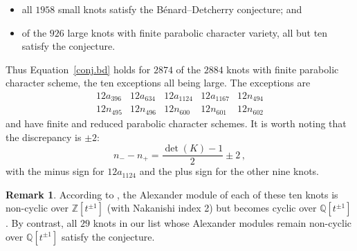 \documentclass[12pt,reqno]{amsart}
\theoremstyle{definition}
\newtheorem{remark}[theorem]{Remark}
\begin{document}
	\begin{itemize}
		\item all $1958$ small knots satisfy the B\'{e}nard--Detcherry conjecture; and
		\item of the $926$ large knots with finite parabolic character variety, all but ten satisfy the conjecture.
	\end{itemize}
	Thus Equation~\eqref{conj.bd} holds for $2874$ of the $2884$ knots with finite parabolic character scheme, the ten exceptions all being large. The exceptions are
	\[
	\begin{array}{*{5}{l}}
		12a_{396} & 12a_{634} & 12a_{1124} & 12a_{1167} & 12n_{494} \\
		12n_{495} & 12n_{496} & 12n_{600} & 12n_{601} & 12n_{602}
	\end{array}
	\]
	and have finite and reduced parabolic character schemes. It is worth noting that the discrepancy is $\pm2$:
	\begin{equation*}
	n_- - n_+ = \frac{\det(K)-1}{2}\pm 2\,,
	\end{equation*}
	with the minus sign for $12a_{1124}$ and the plus sign for the other nine knots. 
    \begin{remark}
    According to \cite{knotinfo}, the Alexander module of each of these ten knots is non-cyclic over $\mathbb{Z}[t^{\pm1}]$ (with Nakanishi index 2) but becomes cyclic over $\mathbb{Q}[t^{\pm1}]$. By contrast, all $29$ knots in our list whose Alexander modules remain non-cyclic over $\mathbb{Q}[t^{\pm1}]$ satisfy the conjecture.     
    \end{remark}
    
\end{document}

